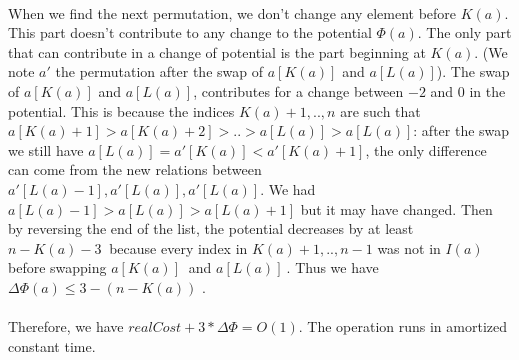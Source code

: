 \paragraph{}
When we find the next permutation, we don't change any element before $K(a)$. This part doesn't contribute to any change to the potential $\Phi(a)$. The only part that can contribute in a change of potential is the part beginning at $K(a)$.
\newline
(We note $a'$ the permutation after the swap of $a[K(a)]$ and $a[L(a)]$).
The swap of $a[K(a)]$ and $a[L(a)]$, contributes for a change between $-2$ and $0$ in the potential. This is because the indices $K(a)+1,..,n$ are such that $a[K(a)+1]>a[K(a)+2]>..>a[L(a)]>a[L(a)]$: after the swap we still have $a[L(a)]=a'[K(a)]<a'[K(a)+1]$, the only difference can come from the new relations between $a'[L(a)-1],a'[L(a)],a'[L(a)]$. We had $a[L(a)-1]>a[L(a)]>a[L(a)+1]$ but it may have changed.
\newline
Then by reversing the end of the list, the potential decreases by at least $n-K(a)-3\ $ because every index in $K(a)+1,..,n-1$ was not in $I(a)$ before swapping $a[K(a)]\ $ and $a[L(a)]\ $.
\newline
Thus we have $\Delta\Phi(a)\leq{3-(n-K(a))}$ .
\paragraph{}
Therefore, we have $realCost+3*\Delta\Phi=O(1)$. The operation runs in amortized constant time.